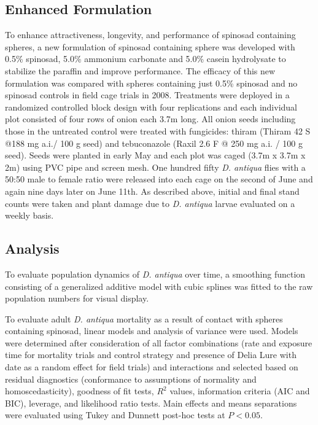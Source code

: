\documentclass[num-refs]{wiley-article}
\begin{document}
\subsection{Enhanced Formulation}

To enhance attractiveness, longevity, and performance of spinosad containing spheres, a new formulation of spinosad containing sphere was developed with 0.5\% spinosad, 5.0\% ammonium carbonate and 5.0\% casein hydrolysate to stabilize the paraffin and improve performance. The efficacy of this new formulation was compared with spheres containing just 0.5\% spinosad and no spinosad controls in field cage trials in 2008. Treatments were deployed in a randomized controlled block design with four replications and each individual plot consisted of four rows of onion each 3.7m long. All onion seeds including those in the untreated control were treated with fungicides: thiram (Thiram 42 S {@}188 mg a.i./ 100 g seed) and tebuconazole (Raxil 2.6 F @ 250 mg a.i. / 100 g seed). Seeds were planted in early May and each plot was caged (3.7m x 3.7m x 2m) using PVC pipe and screen mesh. One hundred fifty \textit{D. antiqua} flies with a 50:50 male to female ratio were released into each cage on the second of June and again nine days later on June 11th. As described above, initial and final stand counts were taken and plant damage due to \textit{D. antiqua} larvae evaluated on a weekly basis.  


\subsection{Analysis}

To evaluate population dynamics of \textit{D. antiqua} over time, a smoothing function consisting of a generalized additive model with cubic splines was fitted to the raw population numbers for visual display.  

To evaluate adult \textit{D. antiqua} mortality as a result of contact with spheres containing spinosad, linear models and analysis of variance were used.  Models were determined after consideration of all factor combinations (rate and exposure time for mortality trials and control strategy and presence of Delia Lure with date as a random effect for field trials) and interactions and selected based on residual diagnostics (conformance to assumptions of normality and homoscedasticity), goodness of fit tests, $R^2$ values, information criteria (AIC and BIC), leverage, and likelihood ratio tests. Main effects and means separations were evaluated using Tukey and Dunnett post-hoc tests at $P < 0.05$.  
\end{document}
